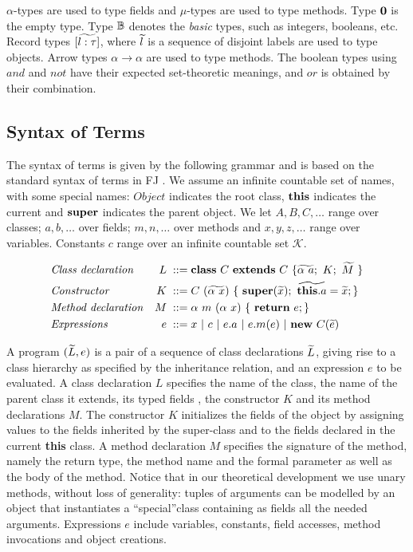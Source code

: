 \documentclass{l4proj}
\begin{document}
$\alpha$-types are used to type fields and $\mu$-types are used to type methods.
Type $\mathbf{0}$ is the empty type.
Type ${\mathbb B}$ denotes the \emph{basic} types, such as integers, booleans, etc.
    {Record} types $[\widetilde{l:\tau}]$, where $\widetilde{l}$ is a sequence of disjoint labels are used to type objects.
Arrow types $\alpha \to \alpha$ are used to type methods.
The boolean types using ${and}$ and ${not}$ have their expected set-theoretic meanings, and ${or}$ is obtained by their combination.\\

\subsection{Syntax of Terms}

The syntax of terms is given by the following grammar and is based on the standard syntax of terms in FJ \cite{Igarashi1999,Dardha2013,Dardha2017}.
We assume an infinite countable set of names, with some special names: $\mathit{Object}$ indicates the root class, $\mathbf{this}$  indicates the current and $\mathbf{super}$ indicates the parent object.
We let  $A, B, C, \ldots$ range over classes; $a, b, \ldots$ over fields; $m, n, \ldots$ over methods and $x, y, z, \ldots$ range over variables.
Constants $c$ range over an infinite countable set $\mathcal{K}$.

\begin{align*}
     & \mbox{\textit{Class declaration}}  & L \; ::= \; & \syndecl{C}{C}{\wt{\alpha \ a};\ K; \ \wt{M}\ }                         \\
     & \mbox{\textit{Constructor}}        & K \;::=\;   & C\ (\wt{\alpha\ x})\ \{\ \synsuper(\wt{x});\ \wt{\synthis.a}=\wt{x}; \} \\
     & \mbox{\textit{Method declaration}} & M \; ::= \; & \alpha \ m\ (\alpha \ x)\ \{\ \synret e; \}                             \\
     & \mbox{\textit{Expressions}}        & e \; ::=\;  & x\ |\  c\ |\ e.a\ |\ e.m(e) \ | \ \synnew C(\wt{e})
\end{align*}

A {program} $(\widetilde{L}, e)$ is a pair of a sequence of class declarations $\widetilde{L}$, giving rise to a class hierarchy as specified by the inheritance relation, and an expression $e$ to be evaluated.
%
A class declaration $L$ specifies the name of the class, the name of the parent class it extends, its typed fields , the constructor $K$ and its method declarations $M$.
The constructor $K$ initializes the fields of the object by assigning values to the fields inherited by the super-class and to the fields declared in the current \textbf{this} class.
%
A method declaration $M$ specifies the signature of the method, namely the return type, the method name and the formal parameter as well as the body of the method.
Notice that in our theoretical development we use unary methods, without loss of generality: tuples of arguments can be modelled by an object that instantiates a ``special''class containing as fields all the needed arguments.
Expressions $e$ include variables, constants, field accesses, method invocations and object creations.
\end{document}
